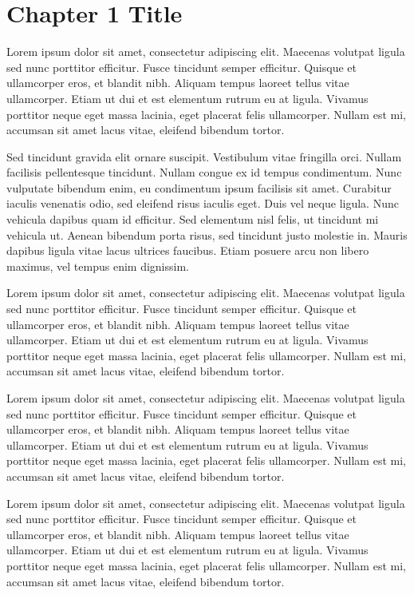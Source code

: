 \chapter{Chapter 1 Title}
Lorem ipsum dolor sit amet, consectetur adipiscing elit. Maecenas volutpat ligula sed nunc porttitor efficitur. Fusce tincidunt semper efficitur. Quisque et ullamcorper eros, et blandit nibh. Aliquam tempus laoreet tellus vitae ullamcorper. Etiam ut dui et est elementum rutrum eu at ligula. Vivamus porttitor neque eget massa lacinia, eget placerat felis ullamcorper. Nullam est mi, accumsan sit amet lacus vitae, eleifend bibendum tortor.\par
Sed tincidunt gravida elit ornare suscipit. Vestibulum vitae fringilla orci. Nullam facilisis pellentesque tincidunt. Nullam congue ex id tempus condimentum. Nunc vulputate bibendum enim, eu condimentum ipsum facilisis sit amet. Curabitur iaculis venenatis odio, sed eleifend risus iaculis eget. Duis vel neque ligula. Nunc vehicula dapibus quam id efficitur. Sed elementum nisl felis, ut tincidunt mi vehicula ut. Aenean bibendum porta risus, sed tincidunt justo molestie in. Mauris dapibus ligula vitae lacus ultrices faucibus. Etiam posuere arcu non libero maximus, vel tempus enim dignissim.\par 
Lorem ipsum dolor sit amet, consectetur adipiscing elit. Maecenas volutpat ligula sed nunc porttitor efficitur. Fusce tincidunt semper efficitur. Quisque et ullamcorper eros, et blandit nibh. Aliquam tempus laoreet tellus vitae ullamcorper. Etiam ut dui et est elementum rutrum eu at ligula. Vivamus porttitor neque eget massa lacinia, eget placerat felis ullamcorper. Nullam est mi, accumsan sit amet lacus vitae, eleifend bibendum tortor.\par
Lorem ipsum dolor sit amet, consectetur adipiscing elit. Maecenas volutpat ligula sed nunc porttitor efficitur. Fusce tincidunt semper efficitur. Quisque et ullamcorper eros, et blandit nibh. Aliquam tempus laoreet tellus vitae ullamcorper. Etiam ut dui et est elementum rutrum eu at ligula. Vivamus porttitor neque eget massa lacinia, eget placerat felis ullamcorper. Nullam est mi, accumsan sit amet lacus vitae, eleifend bibendum tortor.\par
Lorem ipsum dolor sit amet, consectetur adipiscing elit. Maecenas volutpat ligula sed nunc porttitor efficitur. Fusce tincidunt semper efficitur. Quisque et ullamcorper eros, et blandit nibh. Aliquam tempus laoreet tellus vitae ullamcorper. Etiam ut dui et est elementum rutrum eu at ligula. Vivamus porttitor neque eget massa lacinia, eget placerat felis ullamcorper. Nullam est mi, accumsan sit amet lacus vitae, eleifend bibendum tortor.\par
